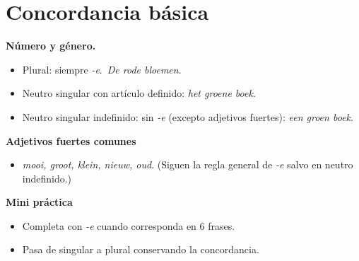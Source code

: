 \section{Concordancia básica}
\textbf{Número y género.}
\begin{itemize}[leftmargin=*]
  \item Plural: siempre \textit{-e}.\ \textit{De rode bloemen}.
  \item Neutro singular con artículo definido: \textit{het groene boek}.
  \item Neutro singular indefinido: sin \textit{-e} (excepto adjetivos fuertes): \textit{een groen boek}.
\end{itemize}

\textbf{Adjetivos fuertes comunes}
\begin{itemize}[leftmargin=*]
  \item \textit{mooi, groot, klein, nieuw, oud}. (Siguen la regla general de \textit{-e} salvo en neutro indefinido.)
\end{itemize}

\textbf{Mini práctica}
\begin{itemize}[leftmargin=*]
  \item Completa con \textit{-e} cuando corresponda en 6 frases.
  \item Pasa de singular a plural conservando la concordancia.
\end{itemize}
